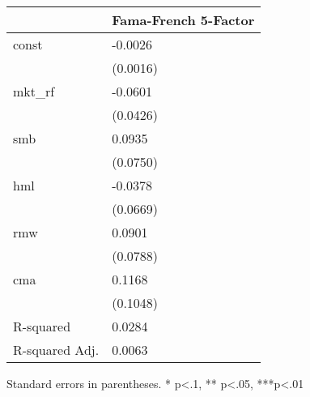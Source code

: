 \begin{table}
\caption{}
\label{}
\begin{center}
\begin{tabular}{ll}
\hline
               & Fama-French 5-Factor  \\
\hline
const          & -0.0026               \\
               & (0.0016)              \\
mkt\_rf        & -0.0601               \\
               & (0.0426)              \\
smb            & 0.0935                \\
               & (0.0750)              \\
hml            & -0.0378               \\
               & (0.0669)              \\
rmw            & 0.0901                \\
               & (0.0788)              \\
cma            & 0.1168                \\
               & (0.1048)              \\
R-squared      & 0.0284                \\
R-squared Adj. & 0.0063                \\
\hline
\end{tabular}
\end{center}
\end{table}
\bigskip
Standard errors in parentheses. \newline 
* p<.1, ** p<.05, ***p<.01